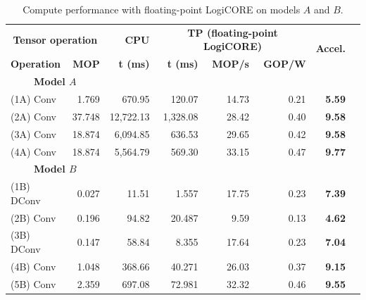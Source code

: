 \begin{table}[!htp]\centering
	\caption{Compute performance with floating-point LogiCORE on models $A$ and $B$.}\label{tab:performace_float_logicore}
	\scriptsize
	\begin{tabular}{lrrrrrrr}\toprule
		\multicolumn{2}{c}{\textbf{Tensor operation}} &\textbf{CPU} &\multicolumn{3}{c}{\textbf{TP (floating-point LogiCORE)}} &\multirow{2}{*}{\textbf{Accel.}} \\\cmidrule{1-6}
		\textbf{Operation} &\textbf{MOP} &\textbf{t (ms)} &\textbf{t (ms)} &\textbf{MOP/s} &\textbf{GOP/W} & \\\midrule
		\multicolumn{2}{c}{\textbf{Model $A$}} & & & & & \\
		(1A) Conv &1.769 &670.95 &120.07 &14.73 &0.21 &\textbf{5.59} \\
		(2A) Conv &37.748 &12,722.13 &1,328.08 &28.42 &0.40 &\textbf{9.58} \\
		(3A) Conv &18.874 &6,094.85 &636.53 &29.65 &0.42 &\textbf{9.58} \\
		(4A) Conv &18.874 &5,564.79 &569.30 &33.15 &0.47 &\textbf{9.77} & \\\midrule
		\multicolumn{2}{c}{\textbf{Model $B$}} & & & & & \\
		(1B) DConv &0.027 &11.51 &1.557 &17.75 &0.23 &\textbf{7.39} \\
		(2B) Conv &0.196 &94.82 &20.487 &9.59 &0.13 &\textbf{4.62} \\
		(3B) DConv &0.147 &58.84 &8.355 &17.64 &0.23 &\textbf{7.04} \\
		(4B) Conv &1.048 &368.66 &40.271 &26.03 &0.37 &\textbf{9.15} \\
		(5B) Conv &2.359 &697.08 &72.981 &32.32 &0.46 &\textbf{9.55} \\
		\bottomrule
	\end{tabular}
\end{table}

